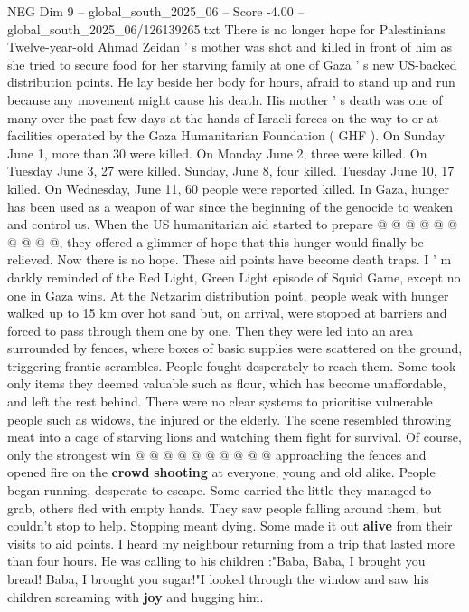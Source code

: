 \begin{textsample}{NEG Dim 9 – global\_south\_2025\_06 – Score -4.00 – global\_south\_2025\_06/126139265.txt}  \label{ex:f9_neg_259}
There is no longer hope for Palestinians Twelve-year-old Ahmad Zeidan ' s mother was shot and killed in front of him as she tried to secure food for her starving family at one of Gaza ' s new US-backed distribution points.
He lay beside her body for hours, afraid to stand up and run because any movement might cause his death.
His mother ' s death was one of many over the past few days at the hands of Israeli forces on the way to or at facilities operated by the Gaza Humanitarian Foundation ( GHF ).
On Sunday June 1, more than 30 were killed.
On Monday June 2, three were killed.
On Tuesday June 3, 27 were killed.
Sunday, June 8, four killed.
Tuesday June 10, 17 killed.
On Wednesday, June 11, 60 people were reported killed.
In Gaza, hunger has been used as a weapon of war since the beginning of the genocide to weaken and control us.
When the US humanitarian aid started to prepare @ @ @ @ @ @ @ @ @ @, they offered a glimmer of hope that this hunger would finally be relieved.
Now there is no hope.
These aid points have become death traps.
I ' m darkly reminded of the Red Light, Green Light episode of Squid Game, except no one in Gaza wins.
At the Netzarim distribution point, people weak with hunger walked up to 15 km over hot sand but, on arrival, were stopped at barriers and forced to pass through them one by one.
Then they were led into an area surrounded by fences, where boxes of basic supplies were scattered on the ground, triggering frantic scrambles.
People fought desperately to reach them.
Some took only items they deemed valuable such as flour, which has become unaffordable, and left the rest behind.
There were no clear systems to prioritise vulnerable people such as widows, the injured or the elderly.
The scene resembled throwing meat into a cage of starving lions and watching them fight for survival.
Of course, only the strongest win @ @ @ @ @ @ @ @ @ @ approaching the fences and opened fire on the \textbf{crowd} \textbf{shooting} at everyone, young and old alike.
People began running, desperate to escape.
Some carried the little they managed to grab, others fled with empty hands.
They saw people falling around them, but couldn't stop to help.
Stopping meant dying.
Some made it out \textbf{alive} from their visits to aid points.
I heard my neighbour returning from a trip that lasted more than four hours.
He was calling to his children :"Baba, Baba, I brought you bread!
Baba, I brought you sugar!"I looked through the window and saw his children screaming with \textbf{joy} and hugging him.

\end{textsample}

